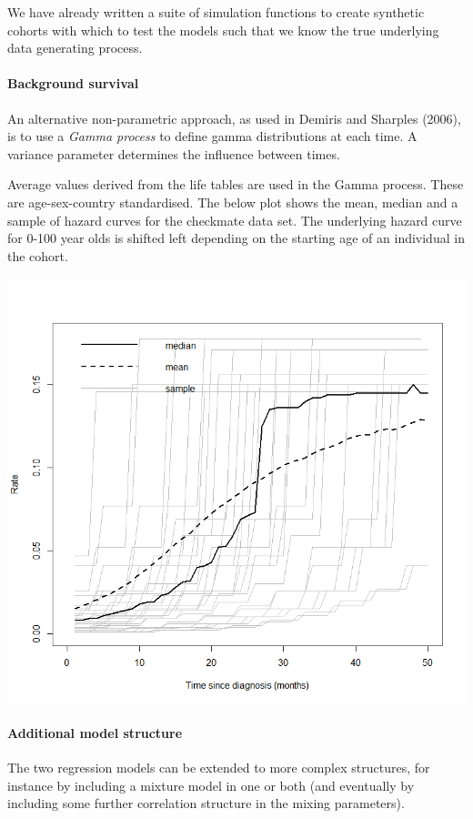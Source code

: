 \documentclass[
]{article}
\begin{document}
We have already written a suite of simulation functions to create
synthetic cohorts with which to test the models such that we know the
true underlying data generating process.

\hypertarget{background-survival-1}{%
\paragraph{Background survival}\label{background-survival-1}}

An alternative non-parametric approach, as used in Demiris and Sharples
(2006), is to use a \emph{Gamma process} to define gamma distributions
at each time. A variance parameter determines the influence between
times.

Average values derived from the life tables are used in the Gamma
process. These are age-sex-country standardised. The below plot shows
the mean, median and a sample of hazard curves for the checkmate data
set. The underlying hazard curve for 0-100 year olds is shifted left
depending on the starting age of an individual in the cohort.

\begin{center}\includegraphics[width=0.6\linewidth]{../docs/background_average_rate_plot} \end{center}

\hypertarget{additional-model-structure}{%
\paragraph{Additional model
structure}\label{additional-model-structure}}

The two regression models can be extended to more complex structures,
for instance by including a mixture model in one or both (and eventually
by including some further correlation structure in the mixing
parameters).
\end{document}
